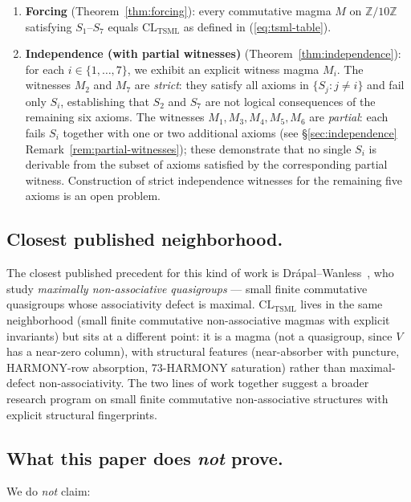 \documentclass[11pt,reqno]{amsart}
\theoremstyle{plain}
\theoremstyle{definition}
\theoremstyle{remark}
\newcommand{\Z}{\mathbb{Z}}
\newcommand{\TSML}{\mathrm{TSML}}
\newcommand{\CL}{\mathrm{CL}}
\begin{document}
\begin{enumerate}
\item \textbf{Forcing} (Theorem~\ref{thm:forcing}): every commutative
magma $M$ on $\Z/10\Z$ satisfying $S_{1}$--$S_{7}$ equals
$\CL_{\TSML}$ as defined in (\ref{eq:tsml-table}).

\item \textbf{Independence (with partial witnesses)}
(Theorem~\ref{thm:independence}): for each
$i \in \{1, \ldots, 7\}$, we exhibit an explicit witness magma
$M_{i}$. The witnesses $M_{2}$ and $M_{7}$ are \emph{strict}: they
satisfy all axioms in $\{S_{j} : j \neq i\}$ and fail only $S_{i}$,
establishing that $S_{2}$ and $S_{7}$ are not logical consequences
of the remaining six axioms. The witnesses $M_{1}, M_{3}, M_{4},
M_{5}, M_{6}$ are \emph{partial}: each fails $S_{i}$ together with
one or two additional axioms (see §\ref{sec:independence}
Remark~\ref{rem:partial-witnesses}); these demonstrate that no
single $S_{i}$ is derivable from the subset of axioms satisfied by
the corresponding partial witness. Construction of strict
independence witnesses for the remaining five axioms is an open
problem.
\end{enumerate}

\subsection{Closest published neighborhood.}
The closest published precedent for this kind of work is
Drápal--Wanless~\cite{DrapalWanless2021}, who study
\emph{maximally non-associative quasigroups} --- small finite
commutative quasigroups whose associativity defect is maximal.
$\CL_{\TSML}$ lives in the same neighborhood (small finite
commutative non-associative magmas with explicit invariants) but
sits at a different point: it is a magma (not a quasigroup, since
$V$ has a near-zero column), with structural features (near-absorber
with puncture, HARMONY-row absorption, $73$-HARMONY saturation)
rather than maximal-defect non-associativity. The two lines of work
together suggest a broader research program on small finite
commutative non-associative structures with explicit structural
fingerprints.

\subsection{What this paper does \emph{not} prove.}
We do \emph{not} claim:
\end{document}
